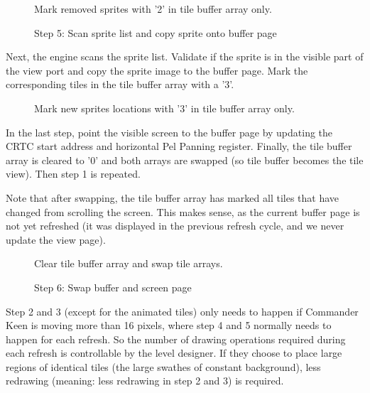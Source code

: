 \documentclass[book.tex]{subfiles}
\begin{document}
\begin{figure}[H]
\centering
 \caption{Mark removed sprites with '2' in tile buffer array only.}
 \label{fig:kc1_3_tile_update_remove}
\end{figure}


\pagebreak

\begin{figure}[H]
\centering
 \caption{Step 5: Scan sprite list and copy sprite onto buffer page}
 \label{fig:kc1_3_update_sprite}
\end{figure}

Next, the engine scans the sprite list. Validate if the sprite is in the visible part of the view port and copy the sprite image to the buffer page. Mark the corresponding tiles in the tile buffer array with a '3'.

\begin{figure}[H]
\centering
 \caption{Mark new sprites locations with '3' in tile buffer array only.}
 \label{fig:kc1_3_tile_update_sprite}
\end{figure}



In the last step, point the visible screen to the buffer page by updating the CRTC start address and horizontal Pel Panning register. Finally, the tile buffer array is cleared to '0' and both arrays are swapped (so tile buffer becomes the tile view). Then step 1 is repeated. \\
\par
Note that after swapping, the tile buffer array has marked all tiles that have changed from scrolling the screen. This makes sense, as the current buffer page is not yet refreshed (it was displayed in the previous refresh cycle, and we never update the view page). 

\begin{figure}[H]
\centering
 \caption{Clear tile buffer array and swap tile arrays.}
 \label{fig:kc1_3_tile_final}
\end{figure}


\pagebreak

\begin{figure}[H]
\centering
 \caption{Step 6: Swap buffer and screen page}
 \label{fig:kc1_3_update_final}
\end{figure}

Step 2 and 3 (except for the animated tiles) only needs to happen if Commander Keen is moving more than 16 pixels, where step 4 and 5 normally needs to happen for each refresh.
So the number of drawing operations required during each refresh is controllable by the level designer. If they choose to place large regions of identical tiles (the large swathes of constant background), less redrawing (meaning: less redrawing in step 2 and 3) is required.

\pagebreak
\end{document}
